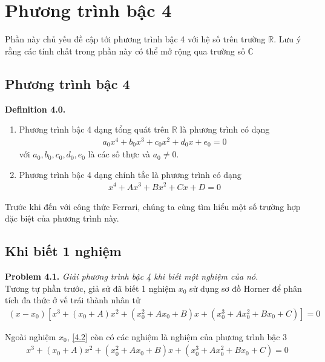 \documentclass[a4paper,oneside]{book}
\numberwithin{equation}{chapter}
\begin{document}
\chapter{Phương trình bậc 4}
Phần này chủ yếu đề cập tới phương trình bậc 4 với hệ số trên trường $\mathbb{R}$. Lưu ý rằng các tính chất trong phần này có thể mở rộng qua trường số $\mathbb{C}$
\section{Phương trình bậc 4}
\textbf{Definition 4.0.} 
\begin{enumerate}
\item Phương trình bậc 4 dạng tổng quát trên $\mathbb{R}$ là phương trình có dạng
\begin{align}
{a_0}{x^4} + {b_0}{x^3} + {c_0}{x^2} + {d_0}x + {e_0} = 0
\end{align}
với $a_0,b_0,c_0,d_0,e_0$ là các số thực và $a_0 \ne 0$.
\item Phương trình bậc 4 dạng chính tắc là phương trình có dạng
\begin{align}
\label{4.2}
{x^4} + A{x^3} + B{x^2} + Cx + D = 0
\end{align}
\end{enumerate}

Trước khi đến với công thức Ferrari, chúng ta cùng tìm hiểu một số trường hợp đặc biệt của phương trình này.
\section{Khi biết 1 nghiệm}
\textbf{Problem 4.1.} \textit{Giải phương trình bậc 4 khi biết một nghiệm của nó.}\\

Tương tự phần trước, giả sử đã biết 1 nghiệm ${x_0}$ sử dụng sơ đồ Horner để phân tích đa thức ở vế trái thành nhân tử
\begin{align}
\left( {x - {x_0}} \right)\left[ {{x^3} + \left( {{x_0} + A} \right){x^2} + \left( {x_0^2 + A{x_0} + B} \right)x + \left( {x_0^3 + Ax_0^2 + B{x_0} + C} \right)} \right] = 0
\end{align}

Ngoài nghiệm ${x_0}$, \eqref{4.2} còn có các nghiệm là nghiệm của phương trình bậc 3
\begin{align}
\label{4.4}
{x^3} + \left( {{x_0} + A} \right){x^2} + \left( {x_0^2 + A{x_0} + B} \right)x + \left( {x_0^3 + Ax_0^2 + B{x_0} + C} \right) = 0
\end{align}
\end{document}
